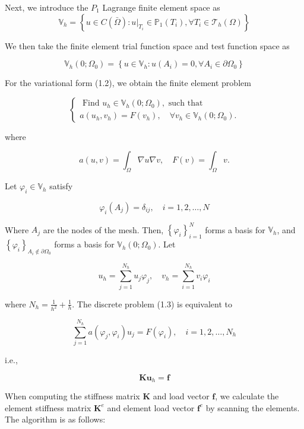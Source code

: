 \documentclass{article}
\begin{document}
Next, we introduce the $P_1$ Lagrange finite element space as
$$
\mathbb{V}_{h}=\left\{u \in C(\bar{\Omega}): \left.u\right|_{T_{i}} \in \mathbb{P}_{1}\left(T_{i}\right), \forall T_{i} \in \mathcal{T}_{h}(\Omega)\right\}
$$

We then take the finite element trial function space and test function space as

$$
\mathbb{V}_{h}\left(0 ; \Omega_{0}\right)=\left\{u \in \mathbb{V}_{h}: u\left(A_{i}\right)=0, \forall A_{i} \in \partial \Omega_{0}\right\}
$$

For the variational form (1.2), we obtain the finite element problem

\[
\left\{\begin{array}{l}
\text { Find } u_{h} \in \mathbb{V}_{h}\left(0 ; \Omega_{0}\right), \text { such that }  \tag{1.3}\\
a\left(u_{h}, v_{h}\right)=F\left(v_{h}\right), \quad \forall v_{h} \in \mathbb{V}_{h}\left(0 ; \Omega_{0}\right) .
\end{array}\right.
\]

where

$$
a(u, v)=\int_{\Omega} \nabla u \nabla v, \quad F(v)=\int_{\Omega} v.
$$

Let $\varphi_{i} \in \mathbb{V}_{h}$ satisfy

$$
\varphi_{i}\left(A_{j}\right)=\delta_{i j}, \quad i=1,2, \dots, N
$$

Where $A_{j}$ are the nodes of the mesh. Then, $\left\{\varphi_{i}\right\}_{i=1}^{N}$ forms a basis for $\mathbb{V}_{h}$, and $\left\{\varphi_{i}\right\}_{A_{i} \notin \partial \Omega_{0}}$ forms a basis for $\mathbb{V}_{h}\left(0 ; \Omega_{0}\right)$. Let

$$
u_{h}=\sum_{j=1}^{N_{h}} u_{j} \varphi_{j}, \quad v_{h}=\sum_{i=1}^{N_{h}} v_{i} \varphi_{i}
$$

where $N_{h}=\frac{1}{h^{2}}+\frac{1}{h}$. The discrete problem (1.3) is equivalent to

$$
\sum_{j=1}^{N_{h}} a\left(\varphi_{j}, \varphi_{i}\right) u_{j}=F\left(\varphi_{i}\right), \quad i=1,2, \dots, N_{h}
$$

i.e.,

\begin{equation}
\boldsymbol{K} \boldsymbol{u}_{h}=\boldsymbol{f} \label{eq:stiff}
\end{equation}

When computing the stiffness matrix $\boldsymbol{K}$ and load vector $\boldsymbol{f}$, we calculate the element stiffness matrix $\boldsymbol{K}^{e}$ and element load vector $\boldsymbol{f}^{e}$ by scanning the elements. The algorithm is as follows:
\end{document}
